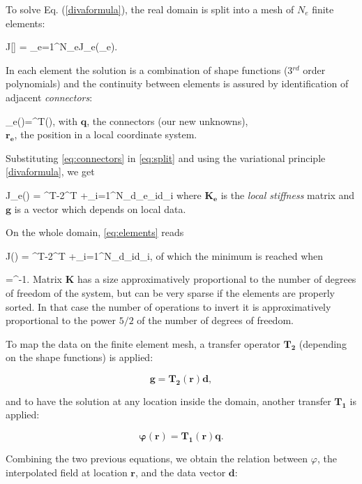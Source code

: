 To solve Eq. (\ref{divaformula}), the real domain is split into a mesh of $N_e$ finite elements:

\be
J[\varphi] = \sum_{e=1}^{N_{e}}J_{e}(\varphi_{e}).
\label{eq:split}
\ee

In each element the solution is a combination of shape functions (3$^{rd}$ order polynomials) and the continuity between elements is assured by identification of adjacent \textit{connectors}:

\be
\varphi_{e}()=^{T}(),
\label{eq:connectors}
\ee
with $\mathbf{q}$, the connectors (our new unknowns),\\
\hphantom{with} $\mathbf{r_e}$, the position in a local coordinate system.

Substituting \eqref{eq:connectors} in \eqref{eq:split} and using the variational principle \eqref{divaformula}, we get

\be
J_{e}() = ^{T}-2^{T} +\sum_{i=1}^{N_{d_{e}}}\mu_{i}d_{i}
\label{eq:elements}
\ee
where $\mathbf{K_e}$ is the \textit{local stiffness} matrix and\\
\hphantom{where} $\mathbf{g}$ is a vector which depends on local data.

On the whole domain, \eqref{eq:elements} reads

\be
J() = ^{T}-2^{T} +\sum_{i=1}^{N_{d}}\mu_{i}d_{i},
\label{eq:domain}
\ee
of which the minimum is reached when

\be
{}=^{-1}.
\label{eq:solution}
\ee
Matrix $\mathbf{K}$ has a size approximatively proportional to the number of degrees of freedom of the system, but can be very sparse if the elements are properly sorted. In that case the number of operations to invert it is approximatively proportional to the power $5/2$ of the number of degrees of freedom.

To map the data on the finite element mesh, a transfer operator $\mathbf{T_{2}}$ (depending on the shape functions) is applied:

\[\mathbf{g}=\mathbf{T_2}(\mathbf{r})\mathbf{d},\]

and to have the solution at any location inside the domain, another transfer $\mathbf{T_{1}}$ is applied:

\[\boldsymbol{\varphi}(\mathbf{r})=\mathbf{T_1}(\mathbf{r})\mathbf{q}.\]

Combining the two previous equations, we obtain the relation between $\varphi$, the interpolated field at location $\mathbf{r}$,  and the data vector $\mathbf{d}$:

